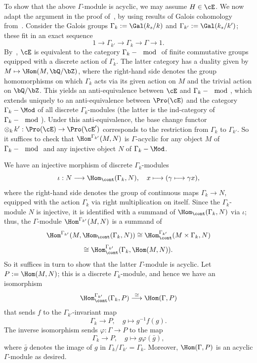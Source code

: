 To show that the above $\Gamma$-module is acyclic, we may assume $H \in \cE$. We now adapt the argument in the proof of~\cite[Lem.~3.10]{Br17b}, by using results of Galois cohomology from~\cite[Chap.~II]{Se97}. Consider the Galois groups $\Gamma_k := \Gal(k_s/k)$ and $\Gamma_{k'} := \Gal(k_s/k')$; these fit in an exact sequence
\[
1 \longrightarrow \Gamma_{k'} \longrightarrow
\Gamma_k \longrightarrow \Gamma
\longrightarrow 1.
\]
By~\cite[II.5.1.7]{DG}, $\cE$ is equivalent to the category $\Gamma_k-\mod$ of finite commutative groups equipped with a discrete action of $\Gamma_k$. The latter category has a duality given by $M \mapsto \Hom(M,\bQ/\bZ)$, where the right-hand side denotes the group homomorphisms on which $\Gamma_k$ acts via its given action on $M$ and the trivial action on $\bQ/\bZ$. This yields an anti-equivalence between $\cE$ and $\Gamma_k-\mod$, which extends uniquely to an anti-equivalence between $\Pro(\cE)$ and the category $\Gamma_k-\Mod$ of all discrete $\Gamma_k$-modules (the latter is the ind-category of $\Gamma_k-\mod$). Under this anti-equivalence, the base change functor $\otimes_k \, k' : \Pro(\cE) \to \Pro(\cE')$ corresponds to the restriction from $\Gamma_k$ to $\Gamma_{k'}$. So it suffices to check that $\Hom^{\Gamma_{k'}}(M,N)$ is $\Gamma$-acyclic for any object $M$ of $\Gamma_k-\mod$ and any injective object $N$ of $\Gamma_k-\Mod$.

We have an injective morphism of discrete $\Gamma_k$-modules
\[
\iota : N \longrightarrow
\Hom_{\cont}(\Gamma_k,N), \quad x \longmapsto (\gamma \longmapsto \gamma x),
\]
where the right-hand side denotes the group of continuous maps $\Gamma_k \to N$, equipped with the action $\Gamma_k$ via right multiplication on itself. Since the $\Gamma_k$-module $N$ is injective, it is identified with a summand of $\Hom_{\cont}(\Gamma_k,N)$ via $\iota$; thus, the $\Gamma$-module $\Hom^{\Gamma_{k'}}(M,N)$ is a summand of
\[
\Hom^{\Gamma_{k'}} (M, \Hom_{\cont}(\Gamma_k,N)) \cong
\Hom^{\Gamma_{k'}}_{\cont} (M \times \Gamma_k, N)
\]
\[
\cong \Hom^{\Gamma_{k'}}_{\cont} (\Gamma_k, \Hom(M,N)).
\]
So it suffices in turn to show that the latter $\Gamma$-module is acyclic. Let $P := \Hom(M,N)$; this is a discrete $\Gamma_k$-module, and hence we have an isomorphism
\[
\Hom^{\Gamma_{k'}}_{\cont}(\Gamma_k,P)
\stackrel{\cong}{\longrightarrow} \Hom(\Gamma,P)
\]
that sends $f$ to the $\Gamma_{k'}$-invariant map
\[
\Gamma_k \longrightarrow P, \quad g \longmapsto g^{-1} f(g).
\]
The inverse isomorphism sends $\varphi : \Gamma \to P$ to the map
\[
\Gamma_k \longrightarrow P, \quad g \longmapsto g \varphi(\bar{g}),
\]
where $\bar{g}$ denotes the image of $g$ in $\Gamma_k/\Gamma_{k'} = \Gamma_k$. Moreover, $\Hom(\Gamma,P)$ is an acyclic $\Gamma$-module as desired.

